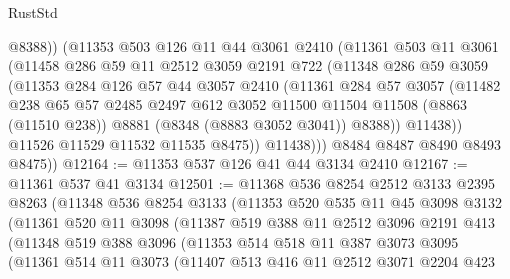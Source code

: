 \begin{lexlean}{RustStd}
\begin{coremodule}
{\begin{coremodule}
{{{{{{{{{{{{{{{{{{{{{{{{{{{{{{{{{{{{{{{{{{{{{{{{{{                @8388))
            (@11353
              @503
              @126
              @11
              @44
              @3061
              @2410
              (@11361
                @503
                @11
                @3061
                (@11458
                  @286
                  @59
                  @11
                  @2512
                  @3059
                  @2191
                  @722
                  (@11348
                    @286
                    @59
                    @3059
                    (@11353
                      @284
                      @126
                      @57
                      @44
                      @3057
                      @2410
                      (@11361
                        @284
                        @57
                        @3057
                        (@11482
                          @238
                          @65
                          @57
                          @2485
                          @2497
                          @612
                          @3052
                          @11500
                          @11504
                          @11508
                          (@8863 (@11510 @238))
                          @8881
                          (@8348 (@8883 @3052 @3041))
                          @8388))
                      @11438))
                  @11526
                  @11529
                  @11532
                  @11535
                  @8475))
              @11438)))
        @8484
        @8487
        @8490
        @8493
        @8475))
@12164 := @11353 @537 @126 @41 @44 @3134 @2410
@12167 := @11361 @537 @41 @3134
@12501 := @11368
    @536
    @8254
    @2512
    @3133
    @2395
    @8263
    (@11348
      @536
      @8254
      @3133
      (@11353
        @520
        @535
        @11
        @45
        @3098
        @3132
        (@11361
          @520
          @11
          @3098
          (@11387
            @519
            @388
            @11
            @2512
            @3096
            @2191
            @413
            (@11348
              @519
              @388
              @3096
              (@11353
                @514
                @518
                @11
                @387
                @3073
                @3095
                (@11361
                  @514
                  @11
                  @3073
                  (@11407
                    @513
                    @416
                    @11
                    @2512
                    @3071
                    @2204
                    @423
}}}}}}}}}}}}}}}}}}}}}}}}}}}}}}}}}}}}}}}}}}}}}}}}}}
\end{coremodule}}
\end{coremodule}
\end{lexlean}
